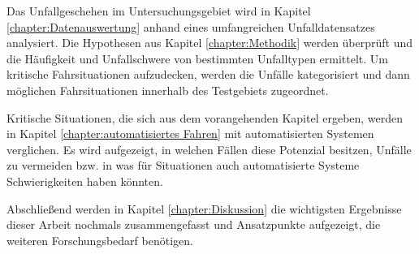 Das Unfallgeschehen im Untersuchungsgebiet wird in Kapitel \ref{chapter:Datenauswertung} anhand eines umfangreichen Unfalldatensatzes analysiert. Die Hypothesen aus Kapitel \ref{chapter:Methodik} werden überprüft und die Häufigkeit und Unfallschwere von bestimmten Unfalltypen ermittelt. Um kritische Fahrsituationen aufzudecken, werden die Unfälle kategorisiert und dann möglichen Fahrsituationen innerhalb des Testgebiets zugeordnet.

Kritische Situationen, die sich aus dem vorangehenden Kapitel ergeben, werden in Kapitel \ref{chapter:automatisiertes Fahren} mit automatisierten Systemen verglichen. Es wird aufgezeigt, in welchen Fällen diese Potenzial besitzen, Unfälle zu vermeiden bzw. in was für Situationen auch automatisierte Systeme Schwierigkeiten haben könnten. 

Abschließend werden in Kapitel \ref{chapter:Diskussion} die wichtigsten Ergebnisse dieser Arbeit nochmals zusammengefasst und Ansatzpunkte aufgezeigt, die weiteren Forschungsbedarf benötigen.
